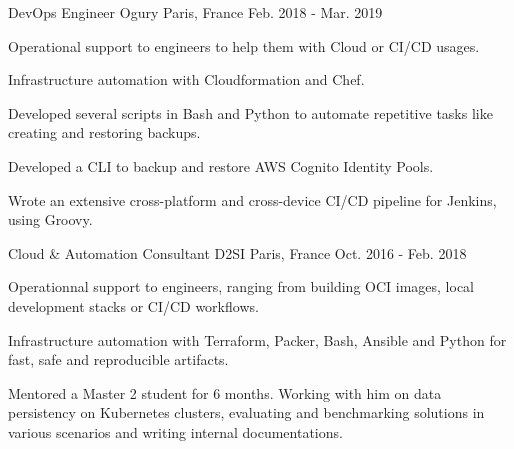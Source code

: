 \begin{cventries}
  \cventry
    {DevOps Engineer} %
    {Ogury} %
    {Paris, France} %
    {Feb. 2018 - Mar. 2019} %
    {
      \begin{cvitems} %
        \item {Operational support to engineers to help them with Cloud or CI/CD usages.}
        \item {Infrastructure automation with Cloudformation and Chef.}
        \item {Developed several scripts in Bash and Python to automate repetitive tasks like creating and restoring backups.}
        \item {Developed a CLI to backup and restore AWS Cognito Identity Pools.}
        \item {Wrote an extensive cross-platform and cross-device CI/CD pipeline for Jenkins, using Groovy.}
      \end{cvitems}
    }

  \cventry
    {Cloud \& Automation Consultant} %
    {D2SI} %
    {Paris, France} %
    {Oct. 2016 - Feb. 2018} %
    {
      \begin{cvitems} %
        \item {Operationnal support to engineers, ranging from building OCI images, local development stacks or CI/CD workflows.}
        \item {Infrastructure automation with Terraform, Packer, Bash, Ansible and Python for fast, safe and reproducible artifacts.}
        \item {Mentored a Master 2 student for 6 months. Working with him on data persistency on Kubernetes clusters, evaluating and benchmarking solutions in various scenarios and writing internal documentations.}
      \end{cvitems}
    }


\end{cventries}
